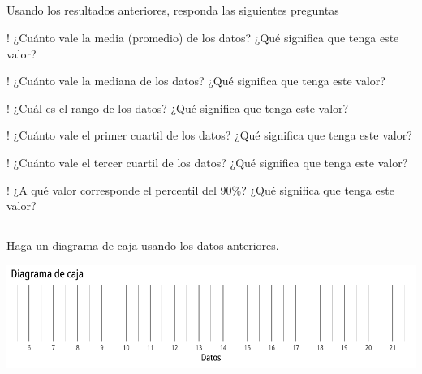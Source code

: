 \documentclass{cdplf-prueba}
\begin{document}
\subsection{}
Usando los resultados anteriores, responda las siguientes preguntas
\begin{tasks}[label={\tcbox[colback=black!60, colframe=black!60, coltext=white, on line, boxsep=0pt, left=3pt, right=3pt, top=2pt, bottom=2pt]{\sffamily\bfseries\alph*}},
item-indent=1.2cm,column-sep=20pt,label-offset=0.3cm,label-width=15pt,after-item-skip=10pt]
    \task! ¿Cuánto vale la media (promedio) de los datos? ¿Qué significa que tenga este valor? \begin{lineas}[height=1.5cm]\end{lineas}
    \task! ¿Cuánto vale la mediana de los datos? ¿Qué significa que tenga este valor? \begin{lineas}[height=1.5cm]\end{lineas}
    \task! ¿Cuál es el rango de los datos? ¿Qué significa que tenga este valor? \begin{lineas}[height=1.5cm]\end{lineas}
    \task! ¿Cuánto vale el primer cuartil de los datos? ¿Qué significa que tenga este valor? \begin{lineas}[height=1.5cm]\end{lineas}
    \task! ¿Cuánto vale el tercer cuartil de los datos? ¿Qué significa que tenga este valor? \begin{lineas}[height=1.5cm]\end{lineas}
    \task! ¿A qué valor corresponde el percentil del 90\%? ¿Qué significa que tenga este valor? \begin{lineas}[height=1.5cm]\end{lineas}
\end{tasks}
\subsection{}

Haga un diagrama de caja usando los datos anteriores.
\begin{center}\includegraphics{diagrama_caja_vacio_2.pdf}\end{center}
\end{document}
